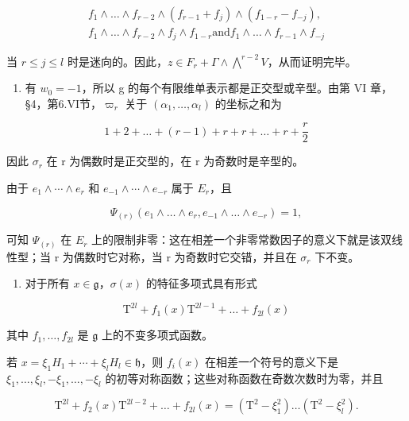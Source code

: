 \[
\begin{array}{c} f _ {1} \wedge \dots \wedge f _ {r - 2} \wedge (f _ {r - 1} + f _ {j}) \wedge (f _ {1 - r} - f _ {- j}), \\ f _ {1} \wedge \dots \wedge f _ {r - 2} \wedge f _ {j} \wedge f _ {1 - r} \text {and} f _ {1} \wedge \dots \wedge f _ {r - 1} \wedge f _ {- j} \end{array}
\]

当 \(r \leq j \leq l\) 时是迷向的。因此，\(z \in F_{r} + \Gamma \wedge \bigwedge^{r-2} V\)，从而证明完毕。

\begin{enumerate}
\def\labelenumi{(\Alph{enumi})}
\setcounter{enumi}{21}
\tightlist
\item
有 \(w_{0} = -1\)，所以 g 的每个有限维单表示都是正交型或辛型。由第 VI 章，§4，第6.VI节，\(\varpi_{r}\) 关于 \((\alpha_{1}, \ldots, \alpha_{l})\) 的坐标之和为
\end{enumerate}

\[
1 + 2 + \dots + (r - 1) + r + r + \dots + r + \frac {r}{2}
\]

因此 \(\sigma_{r}\) 在 r 为偶数时是正交型的，在 r 为奇数时是辛型的。

由于 \(e_{1} \wedge \cdots \wedge e_{r}\) 和 \(e_{-1} \wedge \cdots \wedge e_{-r}\) 属于 \(E_{r}\)，且

\[
\Psi_ {(r)} \left(e _ {1} \wedge \dots \wedge e _ {r}, e _ {- 1} \wedge \dots \wedge e _ {- r}\right) = 1,
\]

可知 \(\Psi_{(r)}\) 在 \(E_{r}\) 上的限制非零：这在相差一个非零常数因子的意义下就是该双线性型；当 r 为偶数时它对称，当 r 为奇数时它交错，并且在 \(\sigma_{r}\) 下不变。

\begin{enumerate}
\def\labelenumi{(\Roman{enumi})}
\setcounter{enumi}{5}
\tightlist
\item
对于所有 \(x \in \mathfrak{g}\)，\(\sigma(x)\) 的特征多项式具有形式
\end{enumerate}

\[
\mathrm{T} ^ {2 l} + f _ {1} (x) \mathrm{T} ^ {2 l - 1} + \dots + f _ {2 l} (x)
\]

其中 \(f_{1},\ldots ,f_{2l}\) 是 \(\mathfrak{g}\) 上的不变多项式函数。

若 \(x = \xi_{1}H_{1} + \cdots + \xi_{l}H_{l} \in \mathfrak{h}\)，则 \(f_{i}(x)\) 在相差一个符号的意义下是 \(\xi_{1}, \ldots, \xi_{l}, -\xi_{1}, \ldots, -\xi_{l}\) 的初等对称函数；这些对称函数在奇数次数时为零，并且

\[
\mathrm{T} ^ {2 l} + f _ {2} (x) \mathrm{T} ^ {2 l - 2} + \dots + f _ {2 l} (x) = (\mathrm{T} ^ {2} - \xi_ {1} ^ {2}) \ldots (\mathrm{T} ^ {2} - \xi_ {l} ^ {2}).
\]

